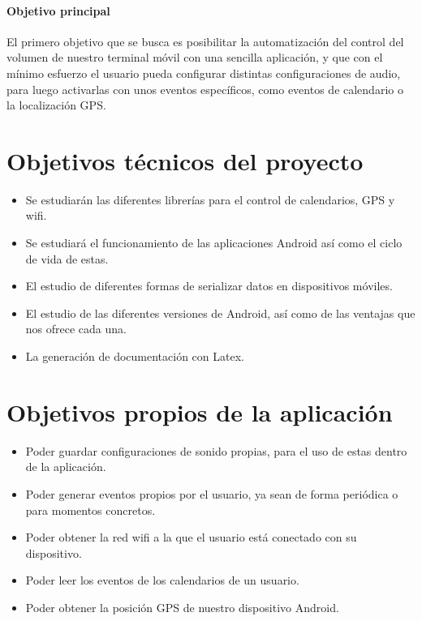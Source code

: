 
\paragraph{Objetivo principal}


El primero objetivo que se busca es posibilitar la automatización del control del volumen de nuestro terminal móvil con una sencilla aplicación, y que con el mínimo esfuerzo el usuario pueda configurar distintas configuraciones de audio, para luego activarlas con unos eventos específicos, como eventos de calendario o la localización GPS.

\section{Objetivos técnicos del proyecto}


\begin{itemize}
	\item Se estudiarán las diferentes librerías para el control de calendarios, GPS y wifi.
	\item Se estudiará el funcionamiento de las aplicaciones Android así como el ciclo de vida de estas.
	\item El estudio de diferentes formas de serializar datos en dispositivos móviles.
	\item El estudio de las diferentes versiones de Android, así como de las ventajas que nos ofrece cada una.
	\item La generación de documentación con Latex.
\end{itemize}

\section{Objetivos propios de la aplicación}


\begin{itemize}
	\item Poder guardar configuraciones de sonido propias, para el uso de estas dentro de la aplicación.
	\item Poder generar eventos propios por el usuario, ya sean de forma periódica o para momentos concretos.
	\item Poder obtener la red wifi a la que el usuario está conectado con su dispositivo.
	\item Poder leer los eventos de los calendarios de un usuario.
	\item Poder obtener la posición GPS de nuestro dispositivo Android.
\end{itemize}